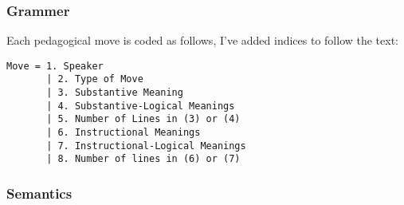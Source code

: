 \documentclass[10pt, letterpaper]{article}
\begin{document}
\subsubsection*{Grammer}
\label{sec:orgd5d94c7}
Each pedagogical move is coded as follows, I've added indices to follow the text: \\
\begin{verbatim}
Move = 1. Speaker 
       | 2. Type of Move 
       | 3. Substantive Meaning
       | 4. Substantive-Logical Meanings 
       | 5. Number of Lines in (3) or (4) 
       | 6. Instructional Meanings 
       | 7. Instructional-Logical Meanings 
       | 8. Number of lines in (6) or (7) 
\end{verbatim}

\subsubsection*{Semantics}
\label{sec:org698fd97}
\end{document}
